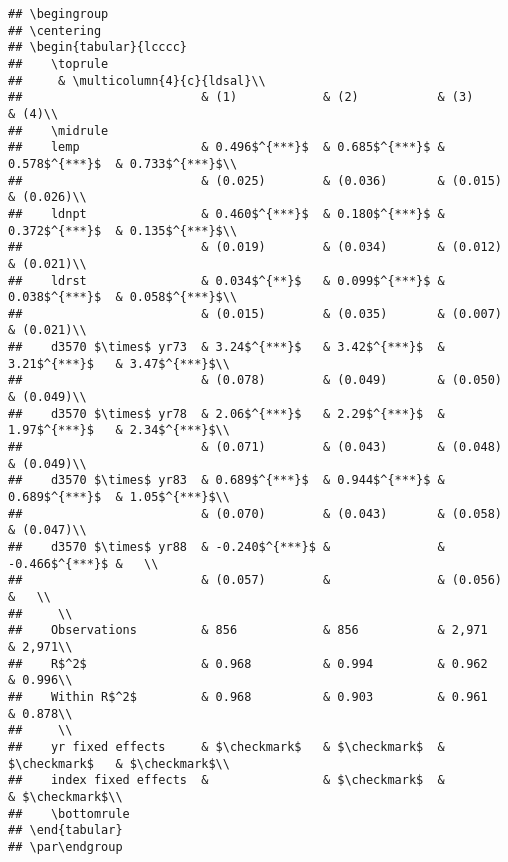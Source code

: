 \documentclass[
]{article}
\begin{document}
\begin{verbatim}
## \begingroup
## \centering
## \begin{tabular}{lcccc}
##    \toprule
##     & \multicolumn{4}{c}{ldsal}\\
##                         & (1)            & (2)           & (3)            & (4)\\  
##    \midrule 
##    lemp                 & 0.496$^{***}$  & 0.685$^{***}$ & 0.578$^{***}$  & 0.733$^{***}$\\   
##                         & (0.025)        & (0.036)       & (0.015)        & (0.026)\\   
##    ldnpt                & 0.460$^{***}$  & 0.180$^{***}$ & 0.372$^{***}$  & 0.135$^{***}$\\   
##                         & (0.019)        & (0.034)       & (0.012)        & (0.021)\\   
##    ldrst                & 0.034$^{**}$   & 0.099$^{***}$ & 0.038$^{***}$  & 0.058$^{***}$\\   
##                         & (0.015)        & (0.035)       & (0.007)        & (0.021)\\   
##    d3570 $\times$ yr73  & 3.24$^{***}$   & 3.42$^{***}$  & 3.21$^{***}$   & 3.47$^{***}$\\   
##                         & (0.078)        & (0.049)       & (0.050)        & (0.049)\\   
##    d3570 $\times$ yr78  & 2.06$^{***}$   & 2.29$^{***}$  & 1.97$^{***}$   & 2.34$^{***}$\\   
##                         & (0.071)        & (0.043)       & (0.048)        & (0.049)\\   
##    d3570 $\times$ yr83  & 0.689$^{***}$  & 0.944$^{***}$ & 0.689$^{***}$  & 1.05$^{***}$\\   
##                         & (0.070)        & (0.043)       & (0.058)        & (0.047)\\   
##    d3570 $\times$ yr88  & -0.240$^{***}$ &               & -0.466$^{***}$ &   \\   
##                         & (0.057)        &               & (0.056)        &   \\   
##     \\
##    Observations         & 856            & 856           & 2,971          & 2,971\\  
##    R$^2$                & 0.968          & 0.994         & 0.962          & 0.996\\  
##    Within R$^2$         & 0.968          & 0.903         & 0.961          & 0.878\\  
##     \\
##    yr fixed effects     & $\checkmark$   & $\checkmark$  & $\checkmark$   & $\checkmark$\\   
##    index fixed effects  &                & $\checkmark$  &                & $\checkmark$\\   
##    \bottomrule
## \end{tabular}
## \par\endgroup
\end{verbatim}
\end{document}

